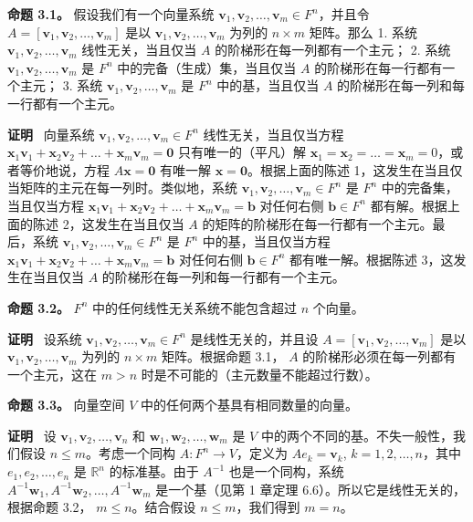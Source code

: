 \textbf{命题 3.1。} 假设我们有一个向量系统 $\mathbf{v}_1, \mathbf{v}_2, \dots, \mathbf{v}_m \in F^n$，并且令 $A = [\mathbf{v}_1, \mathbf{v}_2, \dots, \mathbf{v}_m]$ 是以 $\mathbf{v}_1, \mathbf{v}_2, \dots, \mathbf{v}_m$ 为列的 $n \times m$ 矩阵。那么
1. 系统 $\mathbf{v}_1, \mathbf{v}_2, \dots, \mathbf{v}_m$ 线性无关，当且仅当 $A$ 的阶梯形在每一列都有一个主元；
2. 系统 $\mathbf{v}_1, \mathbf{v}_2, \dots, \mathbf{v}_m$ 是 $F^n$ 中的完备（生成）集，当且仅当 $A$ 的阶梯形在每一行都有一个主元；
3. 系统 $\mathbf{v}_1, \mathbf{v}_2, \dots, \mathbf{v}_m$ 是 $F^n$ 中的基，当且仅当 $A$ 的阶梯形在每一列和每一行都有一个主元。

\textbf{证明}~ 向量系统 $\mathbf{v}_1, \mathbf{v}_2, \dots, \mathbf{v}_m \in F^n$ 线性无关，当且仅当方程 $\mathbf{x}_1 \mathbf{v}_1 + \mathbf{x}_2 \mathbf{v}_2 + \dots + \mathbf{x}_m \mathbf{v}_m = \mathbf{0}$ 只有唯一的（平凡）解 $\mathbf{x}_1 = \mathbf{x}_2 = \dots = \mathbf{x}_m = 0$，或者等价地说，方程 $A \mathbf{x} = \mathbf{0}$ 有唯一解 $\mathbf{x} = \mathbf{0}$。根据上面的陈述 1，这发生在当且仅当矩阵的主元在每一列时。类似地，系统 $\mathbf{v}_1, \mathbf{v}_2, \dots, \mathbf{v}_m \in F^n$ 是 $F^n$ 中的完备集，当且仅当方程 $\mathbf{x}_1 \mathbf{v}_1 + \mathbf{x}_2 \mathbf{v}_2 + \dots + \mathbf{x}_m \mathbf{v}_m = \mathbf{b}$ 对任何右侧 $\mathbf{b} \in F^n$ 都有解。根据上面的陈述 2，这发生在当且仅当 $A$ 的矩阵的阶梯形在每一行都有一个主元。最后，系统 $\mathbf{v}_1, \mathbf{v}_2, \dots, \mathbf{v}_m \in F^n$ 是 $F^n$ 中的基，当且仅当方程 $\mathbf{x}_1 \mathbf{v}_1 + \mathbf{x}_2 \mathbf{v}_2 + \dots + \mathbf{x}_m \mathbf{v}_m = \mathbf{b}$ 对任何右侧 $\mathbf{b} \in F^n$ 都有唯一解。根据陈述 3，这发生在当且仅当 $A$ 的阶梯形在每一列和每一行都有一个主元。

\textbf{命题 3.2。} $F^n$ 中的任何线性无关系统不能包含超过 $n$ 个向量。

\textbf{证明}~ 设系统 $\mathbf{v}_1, \mathbf{v}_2, \dots, \mathbf{v}_m \in F^n$ 是线性无关的，并且设 $A = [\mathbf{v}_1, \mathbf{v}_2, \dots, \mathbf{v}_m]$ 是以 $\mathbf{v}_1, \mathbf{v}_2, \dots, \mathbf{v}_m$ 为列的 $n \times m$ 矩阵。根据命题 3.1， $A$ 的阶梯形必须在每一列都有一个主元，这在 $m > n$ 时是不可能的（主元数量不能超过行数）。

\textbf{命题 3.3。} 向量空间 $V$ 中的任何两个基具有相同数量的向量。

\textbf{证明}~ 设 $\mathbf{v}_1, \mathbf{v}_2, \dots, \mathbf{v}_n$ 和 $\mathbf{w}_1, \mathbf{w}_2, \dots, \mathbf{w}_m$ 是 $V$ 中的两个不同的基。不失一般性，我们假设 $n \le m$。考虑一个同构 $A: F^n \to V$，定义为 $A e_k = \mathbf{v}_k$, $k = 1, 2, \dots, n$，其中 $e_1, e_2, \dots, e_n$ 是 $\mathbb{R}^n$ 的标准基。由于 $A^{-1}$ 也是一个同构，系统 $A^{-1} \mathbf{w}_1, A^{-1} \mathbf{w}_2, \dots, A^{-1} \mathbf{w}_m$ 是一个基（见第 1 章定理 6.6）。所以它是线性无关的，根据命题 3.2， $m \le n$。结合假设 $n \le m$，我们得到 $m=n$。

